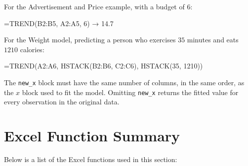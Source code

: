 \documentclass[
  11pt,
  letterpaper,
  DIV=11,
  numbers=noendperiod,
  oneside,
  open=any]{scrreprt}
\newenvironment{Shaded}{\begin{snugshade}}{\end{snugshade}}
\newcommand{\NormalTok}[1]{\textcolor[rgb]{0.00,0.23,0.31}{#1}}
\begin{document}
For the Advertisement and Price example, with a budget of \(6\):

\begin{Shaded}
\begin{Highlighting}[]
\NormalTok{=TREND(B2:B5, A2:A5, 6)   → 14.7}
\end{Highlighting}
\end{Shaded}

For the Weight model, predicting a person who exercises \(35\) minutes
and eats \(1210\) calories:

\begin{Shaded}
\begin{Highlighting}[]
\NormalTok{=TREND(A2:A6, HSTACK(B2:B6, C2:C6), HSTACK(35, 1210))}
\end{Highlighting}
\end{Shaded}

The \texttt{new\_x} block must have the same number of columns, in the
same order, as the \(x\) block used to fit the model. Omitting
\texttt{new\_x} returns the fitted value for every observation in the
original data.

\section{Excel Function Summary}\label{excel-function-summary-4}

Below is a list of the Excel functions used in this section:
\end{document}

